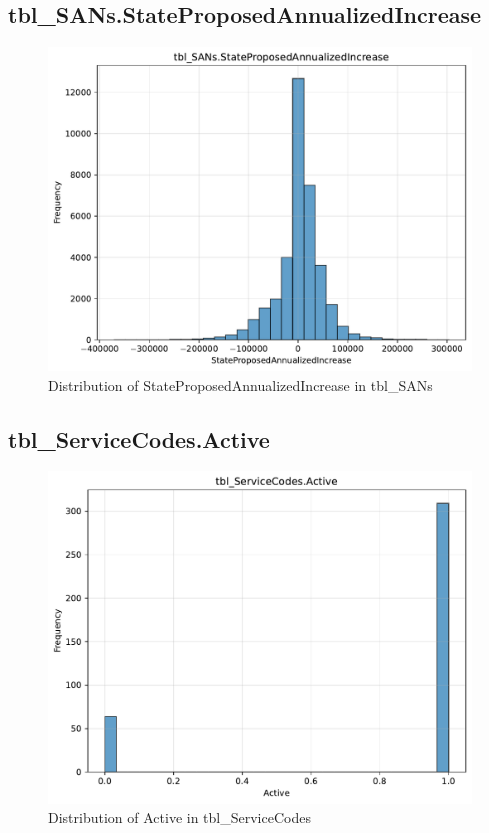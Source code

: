 \subsection{tbl\_SANs.StateProposedAnnualizedIncrease}

\begin{figure}[htbp]
\centering
\includegraphics[width=\textwidth]{figures/dbo_tbl_SANs_StateProposedAnnualizedIncrease.pdf}
\caption{Distribution of StateProposedAnnualizedIncrease in tbl\_SANs}
\end{figure}\newpage

\subsection{tbl\_ServiceCodes.Active}

\begin{figure}[htbp]
\centering
\includegraphics[width=\textwidth]{figures/dbo_tbl_ServiceCodes_Active.pdf}
\caption{Distribution of Active in tbl\_ServiceCodes}
\end{figure}\newpage

